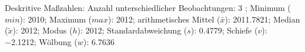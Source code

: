 				\label{tableValues:cend08_g1}
				\vspace*{-\baselineskip}
                    \begin{noten}
                	    \note{} Deskritive Maßzahlen:
                	    Anzahl unterschiedlicher Beobachtungen: 3%
                	    ; 
                	      Minimum ($min$): 2010; 
                	      Maximum ($max$): 2012; 
                	      arithmetisches Mittel ($\bar{x}$): \num[round-mode=places,round-precision=2]{2011,7821}; 
                	      Median ($\tilde{x}$): 2012; 
                	      Modus ($h$): 2012; 
                	      Standardabweichung ($s$): \num[round-mode=places,round-precision=2]{0,4779}; 
                	      Schiefe ($v$): \num[round-mode=places,round-precision=2]{-2,1212}; 
                	      Wölbung ($w$): \num[round-mode=places,round-precision=2]{6,7636}
                     \end{noten}


